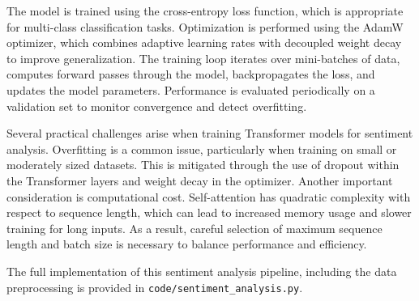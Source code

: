 The model is trained using the cross-entropy loss function,
which is appropriate for multi-class classification tasks.
Optimization is performed using the AdamW optimizer, which
combines adaptive learning rates with decoupled weight
decay to improve generalization.
The training loop iterates over mini-batches of data,
computes forward passes through the model, backpropagates
the loss, and updates the model parameters.
Performance is evaluated periodically on a validation set
to monitor convergence and detect overfitting.

Several practical challenges arise when training Transformer
models for sentiment analysis.
Overfitting is a common issue, particularly when training
on small or moderately sized datasets.
This is mitigated through the use of dropout within the
Transformer layers and weight decay in the optimizer.
Another important consideration is computational cost.
Self-attention has quadratic complexity with respect to
sequence length, which can lead to increased memory usage
and slower training for long inputs.
As a result, careful selection of maximum sequence length
and batch size is necessary to balance performance and
efficiency.

The full implementation of this sentiment analysis pipeline,
including the data preprocessing
is provided in \texttt{code/sentiment_analysis.py}.
